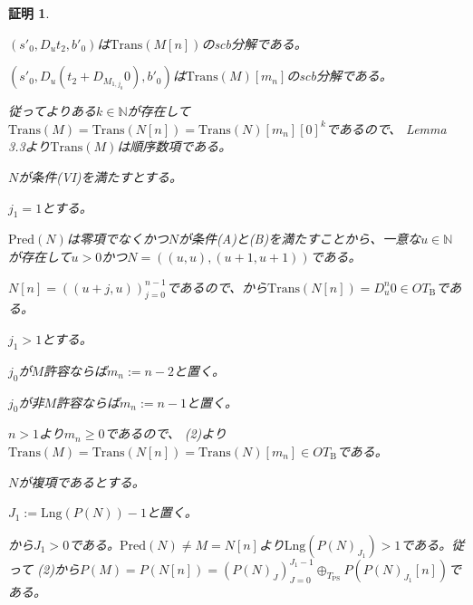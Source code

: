 \documentclass[dvipdfmx,uplatex]{jsarticle}
\theoremstyle{customnonumberbreakfortheorem}
\theoremstyle{customnonumberbreakforproof}
\newtheorem{hideableproof}{証明}
\begin{document}
\begin{hideableproof}
\begin{indented}
\begin{indented}
\begin{indented}
\begin{indented}
					\begin{penumerate}
						\item \((s'_0,D_u t_2,b'_0)\)は\(\textrm{Trans}(M[n])\)のscb分解である。
						\item \((s'_0,D_u(t_2 + D_{M_{1,j_0}} 0),b'_0)\)は\(\textrm{Trans}(M)[m_n]\)のscb分解である。
					\end{penumerate}
					\item 従ってよりある\(k \in \mathbb{N}\)が存在して\(\textrm{Trans}(M)  = \textrm{Trans}(N[n]) = \textrm{Trans}(N)[m_n][0]^k\)であるので、\cite{buc1} Lemma 3.3より\(\textrm{Trans}(M)\)は順序数項である。
				\end{indented}
				\item
				\item \(N\)が条件(VI)を満たすとする。
				\begin{indented}
					\item \(j_1 = 1\)とする。
					\begin{indented}
						\item \(\textrm{Pred}(N)\)は零項でなくかつ\(N\)が条件(A)と(B)を満たすことから、一意な\(u \in \mathbb{N}\)が存在して\(u > 0\)かつ\(N = ((u,u),(u+1,u+1))\)である。
						\item \(N[n] = ((u+j,u))_{j=0}^{n-1}\)であるので、から\(\textrm{Trans}(N[n]) = D_u^n 0 \in OT_{\textrm{B}}\)である。
					\end{indented}
					\item \(j_1 > 1\)とする。
					\item \(j_0\)が\(M\)許容ならば\(m_n := n-2\)と置く。
					\item \(j_0\)が非\(M\)許容ならば\(m_n := n-1\)と置く。
					\item \(n > 1\)より\(m_n \geq 0\)であるので、 (2)より\(\textrm{Trans}(M) = \textrm{Trans}(N[n]) = \textrm{Trans}(N)[m_n] \in OT_{\textrm{B}}\)である。
				\end{indented}
			\end{indented}
			\item
			\item \(N\)が複項であるとする。
			\begin{indented}
				\item \(J_1 := \textrm{Lng}(P(N))-1\)と置く。
				\item {}から\(J_1 > 0\)である。\(\textrm{Pred}(N) \neq M = N[n]\)より\(\textrm{Lng}(P(N)_{J_1}) > 1\)である。従って (2)から\(P(M) = P(N[n]) = (P(N)_J)_{J=0}^{J_1-1} \oplus_{T_{\textrm{PS}}} P(P(N)_{J_1}[n])\)である。

\end{indented}
\end{indented}
\end{indented}
\end{hideableproof}
\end{document}
